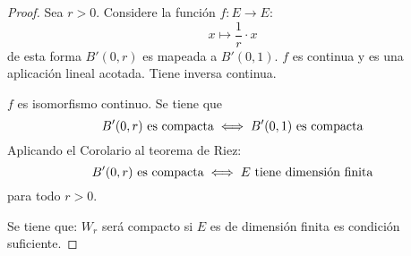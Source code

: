 \documentclass[12pt]{report}
\newcounter{it}
\theoremstyle{largebreak}
\newcommand\cf[3]{\ensuremath{#1:#2\rightarrow#3}}
\begin{document}
    \begin{proof}
        Sea $r>0$. Considere la función $\cf{f}{E}{E}$:
        \begin{equation*}
            x\mapsto \frac{1}{r}\cdot x
        \end{equation*}
        de esta forma $B'(0,r)$ es mapeada a $B'(0,1)$. $f$ es continua y es una aplicación lineal acotada. Tiene inversa continua.

        $f$ es isomorfismo continuo. Se tiene que
        \begin{equation*}
            B'(0,r) \textup{ es compacta}\iff B'(0,1) \textup{ es compacta}
        \end{equation*}
        Aplicando el Corolario al teorema de Riez:
        \begin{equation*}
            B'(0,r) \textup{ es compacta}\iff E\textup{ tiene dimensión finita}
        \end{equation*}
        para todo $r>0$.

        Se tiene que: $W_r$ será compacto si $E$ es de dimensión finita es condición suficiente.


\end{proof}
\end{document}
